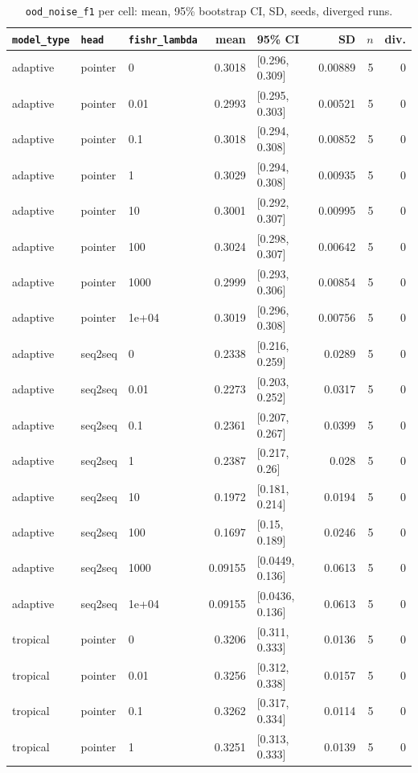 \documentclass[10pt]{article}
\begin{document}
{\small
\begin{longtable}{lllrlrrr}
\caption{\texttt{ood\_noise\_f1} per cell: mean, 95\% bootstrap CI, SD, seeds, diverged runs.}\label{tab:summary-ood_noise_f1}\\
\toprule
\texttt{model\_type} & \texttt{head} & \texttt{fishr\_lambda} & mean & 95\% CI & SD & $n$ & div.\\
\midrule
\endhead
adaptive & pointer & 0 & 0.3018 & [0.296, 0.309] & 0.00889 & 5 & 0\\
adaptive & pointer & 0.01 & 0.2993 & [0.295, 0.303] & 0.00521 & 5 & 0\\
adaptive & pointer & 0.1 & 0.3018 & [0.294, 0.308] & 0.00852 & 5 & 0\\
adaptive & pointer & 1 & 0.3029 & [0.294, 0.308] & 0.00935 & 5 & 0\\
adaptive & pointer & 10 & 0.3001 & [0.292, 0.307] & 0.00995 & 5 & 0\\
adaptive & pointer & 100 & 0.3024 & [0.298, 0.307] & 0.00642 & 5 & 0\\
adaptive & pointer & 1000 & 0.2999 & [0.293, 0.306] & 0.00854 & 5 & 0\\
adaptive & pointer & 1e+04 & 0.3019 & [0.296, 0.308] & 0.00756 & 5 & 0\\
adaptive & seq2seq & 0 & 0.2338 & [0.216, 0.259] & 0.0289 & 5 & 0\\
adaptive & seq2seq & 0.01 & 0.2273 & [0.203, 0.252] & 0.0317 & 5 & 0\\
adaptive & seq2seq & 0.1 & 0.2361 & [0.207, 0.267] & 0.0399 & 5 & 0\\
adaptive & seq2seq & 1 & 0.2387 & [0.217, 0.26] & 0.028 & 5 & 0\\
adaptive & seq2seq & 10 & 0.1972 & [0.181, 0.214] & 0.0194 & 5 & 0\\
adaptive & seq2seq & 100 & 0.1697 & [0.15, 0.189] & 0.0246 & 5 & 0\\
adaptive & seq2seq & 1000 & 0.09155 & [0.0449, 0.136] & 0.0613 & 5 & 0\\
adaptive & seq2seq & 1e+04 & 0.09155 & [0.0436, 0.136] & 0.0613 & 5 & 0\\
tropical & pointer & 0 & 0.3206 & [0.311, 0.333] & 0.0136 & 5 & 0\\
tropical & pointer & 0.01 & 0.3256 & [0.312, 0.338] & 0.0157 & 5 & 0\\
tropical & pointer & 0.1 & 0.3262 & [0.317, 0.334] & 0.0114 & 5 & 0\\
tropical & pointer & 1 & 0.3251 & [0.313, 0.333] & 0.0139 & 5 & 0\\

\end{longtable}}
\end{document}
